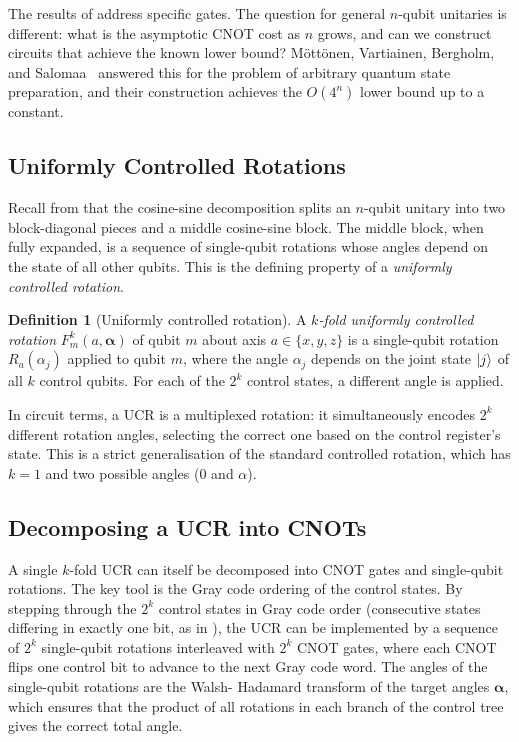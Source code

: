 \documentclass[12pt, a4paper, oneside]{report}
\theoremstyle{plain}
\theoremstyle{definition}
\newtheorem{definition}[theorem]{Definition}
\theoremstyle{remark}
\begin{document}
The results of  address specific gates. The question
for general $n$-qubit unitaries is different: what is the asymptotic CNOT cost as $n$ grows,
and can we construct circuits that achieve the known lower bound? Möttönen, Vartiainen,
Bergholm, and Salomaa~\cite{mottonen2004} answered this for the problem of arbitrary quantum
state preparation, and their construction achieves the $O(4^n)$ lower bound up to a constant.

\subsection{Uniformly Controlled Rotations}

Recall from  that the cosine-sine decomposition splits an $n$-qubit unitary
into two block-diagonal pieces and a middle cosine-sine block. The middle block, when fully
expanded, is a sequence of single-qubit rotations whose angles depend on the state of all
other qubits. This is the defining property of a \emph{uniformly controlled rotation}.

\begin{definition}[Uniformly controlled rotation]
A \emph{$k$-fold uniformly controlled rotation} $F^k_m(a, \boldsymbol{\alpha})$ of qubit $m$
about axis $a \in \{x, y, z\}$ is a single-qubit rotation $R_a(\alpha_j)$ applied to qubit
$m$, where the angle $\alpha_j$ depends on the joint state $\ket{j}$ of all $k$ control
qubits. For each of the $2^k$ control states, a different angle is applied.
\end{definition}

In circuit terms, a UCR is a multiplexed rotation: it simultaneously encodes $2^k$ different
rotation angles, selecting the correct one based on the control register's state. This is a
strict generalisation of the standard controlled rotation, which has $k = 1$ and two possible
angles ($0$ and $\alpha$).

\subsection{Decomposing a UCR into CNOTs}

A single $k$-fold UCR can itself be decomposed into CNOT gates and single-qubit rotations.
The key tool is the Gray code ordering of the control states. By stepping through the $2^k$
control states in Gray code order (consecutive states differing in exactly one bit, as in
), the UCR can be implemented by a sequence of $2^k$ single-qubit
rotations interleaved with $2^k$ CNOT gates, where each CNOT flips one control bit to
advance to the next Gray code word. The angles of the single-qubit rotations are the Walsh-
Hadamard transform of the target angles $\boldsymbol{\alpha}$, which ensures that the
product of all rotations in each branch of the control tree gives the correct total angle.
\end{document}
